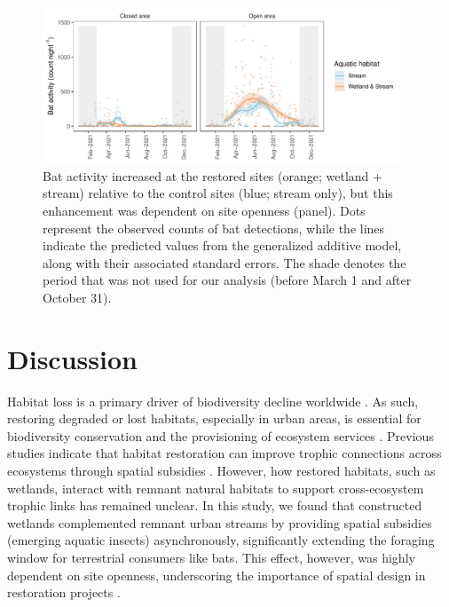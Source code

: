 \documentclass[11pt, class=article, crop=false]{standalone}
\begin{document}
\begin{figure}
    \centering
    \includegraphics[width=0.95\textwidth]{output/figure_bat_habitat.pdf}
    \caption{Bat activity increased at the restored sites (orange; wetland + stream) relative to the control sites (blue; stream only), but this enhancement was dependent on site openness (panel). Dots represent the observed counts of bat detections, while the lines indicate the predicted values from the generalized additive model, along with their associated standard errors. The shade denotes the period that was not used for our analysis (before March 1 and after October 31).}
    \label{fig:bat-activity}
\end{figure}

\newpage

\section{Discussion}

Habitat loss is a primary driver of biodiversity decline worldwide \citep{chase_ecosystem_2020, fluet-chouinard_extensive_2023}.
As such, restoring degraded or lost habitats, especially in urban areas, is essential for biodiversity conservation and the provisioning of ecosystem services \citep{elmqvist_benefits_2015, palmer_ecological_2014}.
Previous studies indicate that habitat restoration can improve trophic connections across ecosystems through spatial subsidies \citep{buckner_conserving_2018, kupilas_stable_2020}.
However, how restored habitats, such as wetlands, interact with remnant natural habitats to support cross-ecosystem trophic links has remained unclear.
In this study, we found that constructed wetlands complemented remnant urban streams by providing spatial subsidies (emerging aquatic insects) asynchronously, significantly extending the foraging window for terrestrial consumers like bats.
This effect, however, was highly dependent on site openness, underscoring the importance of spatial design in restoration projects \citep{olds_synergistic_2012, gilby_spatial_2018, wahl_approximation_2024}.
\end{document}
